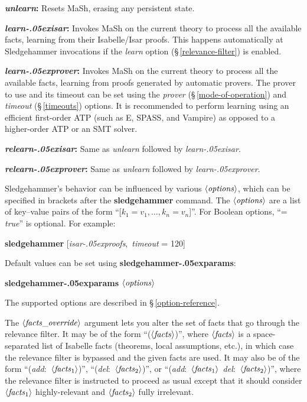 \documentclass[a4paper,12pt]{article}
\let\oldS=\S
\def\S{\oldS\,}
\def\qty#1{\ensuremath{\left<\mathit{#1\/}\right>}}
\renewcommand\_{\hbox{\textunderscore\kern-.05ex}}
\begin{document}
\begin{enum}
\item[\labelitemi] \textbf{\textit{unlearn}:} Resets MaSh, erasing any
persistent state.

\item[\labelitemi] \textbf{\textit{learn\_isar}:} Invokes MaSh on the current
theory to process all the available facts, learning from their Isabelle/Isar
proofs. This happens automatically at Sledgehammer invocations if the
\textit{learn} option (\S\ref{relevance-filter}) is enabled.

\item[\labelitemi] \textbf{\textit{learn\_prover}:} Invokes MaSh on the current
theory to process all the available facts, learning from proofs generated by
automatic provers. The prover to use and its timeout can be set using the
\textit{prover} (\S\ref{mode-of-operation}) and \textit{timeout}
(\S\ref{timeouts}) options. It is recommended to perform learning using an
efficient first-order ATP (such as E, SPASS, and Vampire) as opposed to a
higher-order ATP or an SMT solver.

\item[\labelitemi] \textbf{\textit{relearn\_isar}:} Same as \textit{unlearn}
followed by \textit{learn\_isar}.

\item[\labelitemi] \textbf{\textit{relearn\_prover}:} Same as \textit{unlearn}
followed by \textit{learn\_prover}.
\end{enum}

Sledgehammer's behavior can be influenced by various \qty{options}, which can be
specified in brackets after the \textbf{sledgehammer} command. The
\qty{options} are a list of key--value pairs of the form ``[$k_1 = v_1,
\ldots, k_n = v_n$]''. For Boolean options, ``= \textit{true\/}'' is optional.
For example:

\prew
\textbf{sledgehammer} [\textit{isar\_proofs}, \,\textit{timeout} = 120]
\postw

Default values can be set using \textbf{sledgehammer\_\allowbreak params}:

\prew
\textbf{sledgehammer\_params} \qty{options}
\postw

The supported options are described in \S\ref{option-reference}.

The \qty{facts\_override} argument lets you alter the set of facts that go
through the relevance filter. It may be of the form ``(\qty{facts})'', where
\qty{facts} is a space-separated list of Isabelle facts (theorems, local
assumptions, etc.), in which case the relevance filter is bypassed and the given
facts are used. It may also be of the form ``(\textit{add}:\ \qty{facts\/_{\mathrm{1}}})'',
``(\textit{del}:\ \qty{facts\/_{\mathrm{2}}})'', or ``(\textit{add}:\ \qty{facts\/_{\mathrm{1}}}\
\textit{del}:\ \qty{facts\/_{\mathrm{2}}})'', where the relevance filter is instructed to
proceed as usual except that it should consider \qty{facts\/_{\mathrm{1}}}
highly-relevant and \qty{facts\/_{\mathrm{2}}} fully irrelevant.
\end{document}
